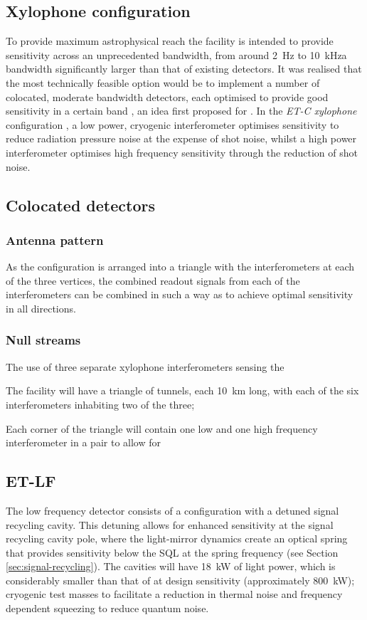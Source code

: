 \subsection{Xylophone configuration}
To provide maximum astrophysical reach the facility is intended to provide sensitivity across an unprecedented bandwidth, from around \SI{2}{\hertz} to \SI{10}{\kilo\hertz}\textemdash a bandwidth significantly larger than that of existing detectors. It was realised that the most technically feasible option would be to implement a number of colocated, moderate bandwidth detectors, each optimised to provide good sensitivity in a certain band \cite{Hild2010}, an idea first proposed for \ALIGO{} \cite{Conforto2004}. In the \emph{ET-C xylophone} configuration \cite{Hild2010}, a low power, cryogenic interferometer optimises sensitivity to reduce radiation pressure noise at the expense of shot noise, whilst a high power interferometer optimises high frequency sensitivity through the reduction of shot noise.

\subsection{Colocated detectors}

\subsubsection{Antenna pattern}
As the configuration is arranged into a triangle with the interferometers at each of the three vertices, the combined readout signals from each of the interferometers can be combined in such a way as to achieve optimal sensitivity in all directions.

\subsubsection{Null streams}
The use of three separate xylophone interferometers sensing the

The facility will have a triangle of tunnels, each \SI{10}{\kilo\meter} long, with each of the six interferometers inhabiting two of the three;

Each corner of the triangle will contain one low and one high frequency interferometer in a pair to allow for 


\subsection{ET-LF}
The low frequency detector consists of a \DRFPMI{} configuration with a detuned signal recycling cavity. This detuning allows for enhanced sensitivity at the signal recycling cavity pole, where the light-mirror dynamics create an optical spring that provides sensitivity below the \gls{SQL} at the spring frequency (see Section\,\ref{sec:signal-recycling}). The cavities will have \SI{18}{\kilo\watt} of light power, which is considerably smaller than that of \ALIGO{} at design sensitivity (approximately \SI{800}{\kilo\watt}); cryogenic test masses to facilitate a reduction in thermal noise and frequency dependent squeezing to reduce quantum noise.


